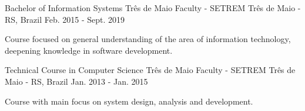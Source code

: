 
\begin{cventries}
  \cventry
  {Bachelor of Information Systems} %
  {Três de Maio Faculty - SETREM} %
  {Três de Maio - RS, Brazil} %
  {Feb. 2015 - Sept. 2019} %
  {
    \begin{cvitems} %
      \item {Course focused on general understanding of the area of information technology,\\deepening knowledge in software development.}
    \end{cvitems}
  }

  \cventry
  {Technical Course in Computer Science} %
  {Três de Maio Faculty - SETREM} %
  {Três de Maio - RS, Brazil} %
  {Jan. 2013 - Jan. 2015} %
  {
    \begin{cvitems} %
      \item {Course with main focus on system design, analysis and development.}
    \end{cvitems}
  }
\end{cventries}
